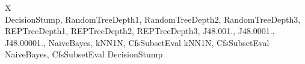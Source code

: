 \begin{table}[h]
\begin{tabularx}{\textwidth}{X}
	 \\ \hline
	DecisionStump, RandomTreeDepth1, RandomTreeDepth2, RandomTreeDepth3, REPTreeDepth1, REPTreeDepth2, REPTreeDepth3, J48.001., J48.0001., J48.00001., NaiveBayes, kNN1N, CfsSubsetEval kNN1N, CfsSubsetEval NaiveBayes, CfsSubsetEval DecisionStump \\ 
	\end{tabularx}
	\caption{The meta features computed by each meta feature group. More details can be found on \href{www.openml.org}{www.openml.org}.}
	\label{tab:metaFeatureDetails}
\end{table}

